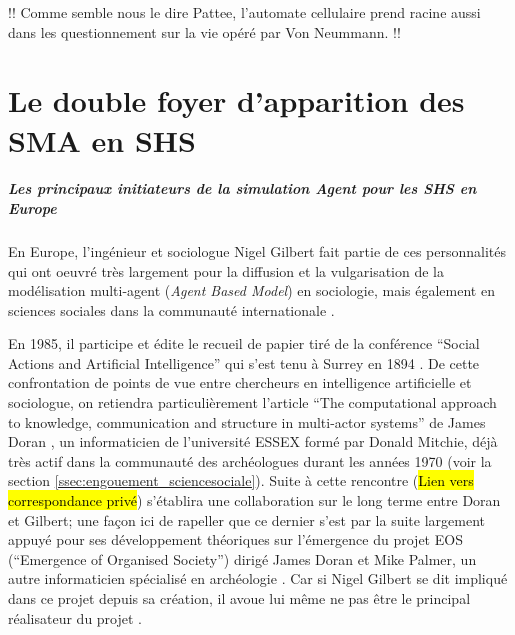 !! Comme semble nous le dire Pattee, l'automate cellulaire prend racine aussi dans les questionnement sur la vie opéré par Von Neummann. !!


\printbibliography[heading=subbibliography]

\chapter{Le double foyer d'apparition des SMA en SHS}
\label{chap:double_foyer_sma}

\paragraph{Les principaux initiateurs de la simulation Agent pour les SHS en Europe}
\label{p:communautes_europe}




En Europe, l'ingénieur et sociologue Nigel Gilbert fait partie de ces personnalités qui ont oeuvré très largement pour la diffusion et la vulgarisation de la modélisation multi-agent (\textit{Agent Based Model}) en sociologie, mais également en sciences sociales dans la communauté internationale .

En 1985, il participe et édite le recueil de papier tiré de la conférence \foreignquote{english}{Social Actions and Artificial Intelligence} qui s'est tenu à Surrey en 1894 \autocite{Gilbert1985}. De cette confrontation de points de vue entre chercheurs en intelligence artificielle et sociologue, on retiendra particulièrement l'article \foreignquote{english}{The computational approach to knowledge, communication and structure in multi-actor systems} de James Doran \autocite{Doran1985}, un informaticien de l'université ESSEX formé par Donald Mitchie, déjà très actif dans la communauté des archéologues durant les années 1970 (voir la section \ref{ssec:engouement_sciencesociale}). Suite à cette rencontre (\hl{Lien vers correspondance privé}) s'établira une collaboration sur le long terme entre Doran et Gilbert; une façon ici de rapeller que ce dernier s'est par la suite largement appuyé pour ses développement théoriques sur l'émergence du projet EOS (\foreignquote{english}{Emergence of Organised Society}) dirigé James Doran et Mike Palmer, un autre informaticien spécialisé en archéologie \autocite{Doran1994a, Gilbert1995a}. Car si Nigel Gilbert se dit impliqué dans ce projet depuis sa création, il avoue lui même ne pas être le principal réalisateur du projet . \autocite[122-131]{Gilbert1995a}


